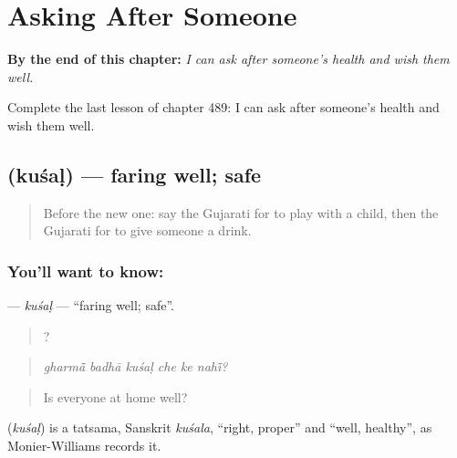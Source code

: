 
\chapter{Asking After Someone}
\label{ch:gu-asking-after-someone}

\begin{chapteropening}
\textbf{By the end of this chapter:} \emph{I can ask after someone's health and wish them well.}

Complete the last lesson of chapter 489: I can ask after someone's health and wish them well.
\end{chapteropening}

\section[\texorpdfstring{\gu{કુશળ} (kuśaḷ)}{કુશળ (kuśaḷ)}]{ (kuśaḷ) — faring well; safe}

\label{lesson:GU-C489-kusal}



\begin{quote}
Before the new one: say the Gujarati for to play with a child, then the Gujarati for to give someone a drink.
\end{quote}

\subsection*{You'll want to know: }
\textbf{} — \emph{kuśaḷ} — \textquotedblleft{}faring well; safe\textquotedblright{}.

\begin{quote}
     ?
\end{quote}

\begin{quote}
\emph{gharmā̃ badhā kuśaḷ che ke nahī̃?}
\end{quote}

\begin{quote}
Is everyone at home well?
\end{quote}

\begin{cousinweb}
\textbf{} (\emph{kuśaḷ}) is a tatsama, Sanskrit \emph{kuśala}, \textquotedblleft{}right, proper\textquotedblright{} and \textquotedblleft{}well, healthy\textquotedblright{}, as Monier-Williams records it.
\end{cousinweb}

